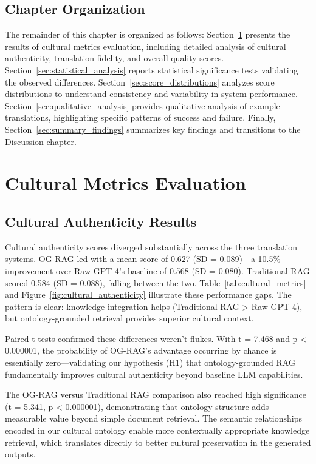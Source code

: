 \subsection{Chapter Organization}

The remainder of this chapter is organized as follows: Section~\ref{sec:cultural_metrics} presents the results of cultural metrics evaluation, including detailed analysis of cultural authenticity, translation fidelity, and overall quality scores. Section~\ref{sec:statistical_analysis} reports statistical significance tests validating the observed differences. Section~\ref{sec:score_distributions} analyzes score distributions to understand consistency and variability in system performance. Section~\ref{sec:qualitative_analysis} provides qualitative analysis of example translations, highlighting specific patterns of success and failure. Finally, Section~\ref{sec:summary_findings} summarizes key findings and transitions to the Discussion chapter.

\section{Cultural Metrics Evaluation}
\label{sec:cultural_metrics}

\subsection{Cultural Authenticity Results}
\label{sec:cultural_authenticity_results}

Cultural authenticity scores diverged substantially across the three translation systems. OG-RAG led with a mean score of 0.627 (SD = 0.089)—a 10.5\% improvement over Raw GPT-4's baseline of 0.568 (SD = 0.080). Traditional RAG scored 0.584 (SD = 0.088), falling between the two. Table~\ref{tab:cultural_metrics} and Figure~\ref{fig:cultural_authenticity} illustrate these performance gaps. The pattern is clear: knowledge integration helps (Traditional RAG > Raw GPT-4), but ontology-grounded retrieval provides superior cultural context.

Paired t-tests confirmed these differences weren't flukes. With t = 7.468 and p < 0.000001, the probability of OG-RAG's advantage occurring by chance is essentially zero—validating our hypothesis (H1) that ontology-grounded RAG fundamentally improves cultural authenticity beyond baseline LLM capabilities.

The OG-RAG versus Traditional RAG comparison also reached high significance (t = 5.341, p < 0.000001), demonstrating that ontology structure adds measurable value beyond simple document retrieval. The semantic relationships encoded in our cultural ontology enable more contextually appropriate knowledge retrieval, which translates directly to better cultural preservation in the generated outputs.

